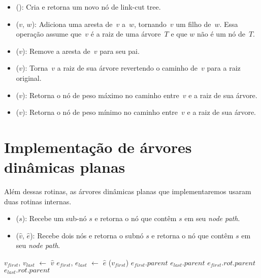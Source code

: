 \begin{itemize}
\item \linkcutCreate(): Cria e retorna um novo nó de link-cut tree.
\item \linkcutAddEdge($v$, $w$): Adiciona uma aresta de~$v$ a~$w$, tornando~$v$ um filho de~$w$. Essa operação assume que~$v$ é a raiz de uma árvore~$T$ e que $w$ não é um nó de~$T$.
\item \linkcutDelEdge($v$): Remove a aresta de~$v$ para seu pai.
\item \linkcutEvert($v$): Torna~$v$ a raiz de sua árvore revertendo o caminho de~$v$ para a raiz original.
\item \linkcutMax($v$): Retorna o nó de peso máximo no caminho entre~$v$ e a raiz de sua árvore.
\item \linkcutMin($v$): Retorna o nó de peso mínimo no caminho entre~$v$ e a raiz de sua árvore.
\end{itemize}


\section{Implementação de árvores dinâmicas planas}

Além dessas rotinas, as árvores dinâmicas planas que implementaremos usaram duas rotinas internas.

\begin{itemize}
\item \LCOFindNode($s$): Recebe um sub-nó $s$ e retorna o nó que contêm $s$ em seu \textit{node path}.
\item \LCOFindSubNode($\hat v$, $\hat e$): Recebe dois nós e retorna o subnó $s$ e retorna o nó que contêm $s$ em seu \textit{node path}.
\end{itemize}





\begin{algorithm}[htb]
\caption{\LCOFindSubNode($\hat v$, $\hat e$)}
\label{Algo:LCOFindSubNode}
\begin{algorithmic}[1]
\State $v_{first}$, $v_{last}$ $\gets$ $\hat v$
\State $e_{first}$, $e_{last}$ $\gets$ $\hat e$
\State \linkcutEvert($v_{first}$)
\State \Return $e_{first}$.$parent$
\EndIf
\State \Return $e_{last}$.$parent$
\Else
{}
\State \Return $e_{first}.rot.parent$
\Else
\State \Return $e_{last}.rot.parent$
\EndIf
\EndIf
\end{algorithmic}
\end{algorithm}



